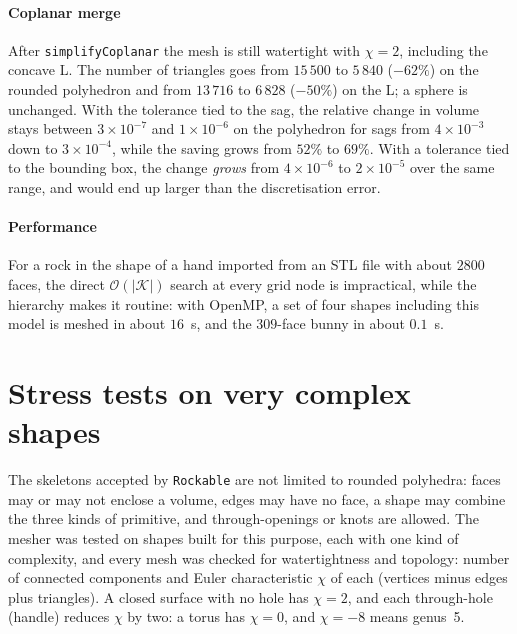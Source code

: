 \documentclass[11pt,a4paper]{article}
\newcommand{\skel}{\mathcal{K}}        %
\newcommand{\code}[1]{\texttt{#1}}
\begin{document}
\paragraph{Coplanar merge} After \code{simplifyCoplanar} the mesh is still
watertight with $\chi=2$, including the concave L. The number of triangles goes from
$15\,500$ to $5\,840$ ($-62\%$) on the rounded polyhedron and from $13\,716$ to
$6\,828$ ($-50\%$) on the L; a sphere is unchanged. With the tolerance tied to the
sag, the relative change in volume stays between $3\times10^{-7}$ and
$1\times10^{-6}$ on the polyhedron for sags from $4\times10^{-3}$ down to
$3\times10^{-4}$, while the saving grows from $52\%$ to $69\%$. With a tolerance
tied to the bounding box, the change \emph{grows} from $4\times10^{-6}$ to
$2\times10^{-5}$ over the same range, and would end up larger than the
discretisation error.

\paragraph{Performance} For a rock in the shape of a hand imported from an STL file
with about $2800$ faces, the direct $\mathcal{O}(|\skel|)$ search at every grid node
is impractical, while the hierarchy makes it routine: with OpenMP, a set of four
shapes including this model is meshed in about $16$~s, and the $309$-face bunny in
about $0.1$~s.

\section{Stress tests on very complex shapes}
\label{sec:complex}

The skeletons accepted by \code{Rockable} are not limited to rounded polyhedra:
faces may or may not enclose a volume, edges may have no face, a shape may combine
the three kinds of primitive, and through-openings or knots are allowed. The
mesher was tested on shapes built for this purpose, each with one kind of
complexity, and every mesh was checked for watertightness and topology: number of
connected components and Euler characteristic $\chi$ of each (vertices minus
edges plus triangles). A closed surface with no hole has $\chi=2$, and each
through-hole (handle) reduces $\chi$ by two: a torus has $\chi=0$, and $\chi=-8$
means genus~5.
\end{document}
